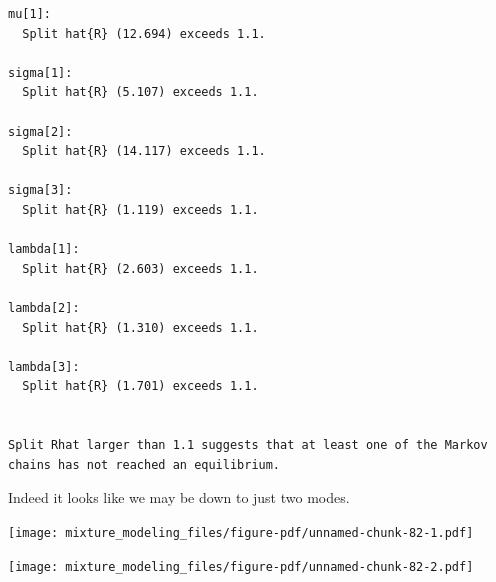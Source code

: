 \documentclass[
  letterpaper,
  DIV=11,
  numbers=noendperiod]{scrartcl}
\newenvironment{Shaded}{\begin{snugshade}}{\end{snugshade}}
\newcommand{\ControlFlowTok}[1]{\textcolor[rgb]{0.00,0.23,0.31}{#1}}
\newcommand{\DecValTok}[1]{\textcolor[rgb]{0.68,0.00,0.00}{#1}}
\newcommand{\FunctionTok}[1]{\textcolor[rgb]{0.28,0.35,0.67}{#1}}
\newcommand{\NormalTok}[1]{\textcolor[rgb]{0.00,0.23,0.31}{#1}}
\newcommand{\OtherTok}[1]{\textcolor[rgb]{0.00,0.23,0.31}{#1}}
\newcommand{\SpecialCharTok}[1]{\textcolor[rgb]{0.37,0.37,0.37}{#1}}
\newcommand{\StringTok}[1]{\textcolor[rgb]{0.13,0.47,0.30}{#1}}
\begin{document}
\begin{verbatim}
mu[1]:
  Split hat{R} (12.694) exceeds 1.1.

sigma[1]:
  Split hat{R} (5.107) exceeds 1.1.

sigma[2]:
  Split hat{R} (14.117) exceeds 1.1.

sigma[3]:
  Split hat{R} (1.119) exceeds 1.1.

lambda[1]:
  Split hat{R} (2.603) exceeds 1.1.

lambda[2]:
  Split hat{R} (1.310) exceeds 1.1.

lambda[3]:
  Split hat{R} (1.701) exceeds 1.1.


Split Rhat larger than 1.1 suggests that at least one of the Markov
chains has not reached an equilibrium.
\end{verbatim}

Indeed it looks like we may be down to just two modes.

\begin{Shaded}
\end{Shaded}

\texttt{[image: mixture\_modeling\_files/figure-pdf/unnamed-chunk-82-1.pdf]}

\begin{Shaded}
\end{Shaded}

\texttt{[image: mixture\_modeling\_files/figure-pdf/unnamed-chunk-82-2.pdf]}
\end{document}
